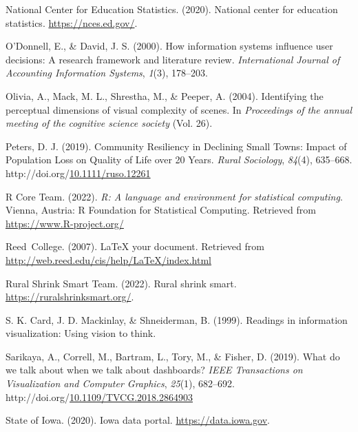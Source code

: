 \documentclass[print]{nuthesis}
\newlength{\cslhangindent}
\newenvironment{CSLReferences}[2]%
{\setlength{\parindent}{0pt}%
\everypar{\setlength{\hangindent}{\cslhangindent}}\ignorespaces}%
{\par}
\begin{document}
\begin{CSLReferences}{1}{0}
\leavevmode{}%
National Center for Education Statistics. (2020). National center for education statistics. \url{https://nces.ed.gov/}.

\leavevmode{}%
O'Donnell, E., \& David, J. S. (2000). How information systems influence user decisions: A research framework and literature review. \emph{International Journal of Accounting Information Systems}, \emph{1}(3), 178--203.

\leavevmode{}%
Olivia, A., Mack, M. L., Shrestha, M., \& Peeper, A. (2004). Identifying the perceptual dimensions of visual complexity of scenes. In \emph{Proceedings of the annual meeting of the cognitive science society} (Vol. 26).

\leavevmode{}%
Peters, D. J. (2019). Community {Resiliency} in {Declining} {Small} {Towns}: {Impact} of {Population} {Loss} on {Quality} of {Life} over 20 {Years}. \emph{Rural Sociology}, \emph{84}(4), 635--668. http://doi.org/\href{https://doi.org/10.1111/ruso.12261}{10.1111/ruso.12261}

\leavevmode{}%
R Core Team. (2022). \emph{R: A language and environment for statistical computing}. Vienna, Austria: R Foundation for Statistical Computing. Retrieved from \url{https://www.R-project.org/}

\leavevmode{}%
Reed~College. (2007). LaTeX your document. Retrieved from \url{http://web.reed.edu/cis/help/LaTeX/index.html}

\leavevmode{}%
Rural Shrink Smart Team. (2022). Rural shrink smart. \url{https://ruralshrinksmart.org/}.

\leavevmode{}%
S. K. Card, J. D. Mackinlay, \& Shneiderman, B. (1999). Readings in information visualization: Using vision to think.

\leavevmode{}%
Sarikaya, A., Correll, M., Bartram, L., Tory, M., \& Fisher, D. (2019). What do we talk about when we talk about dashboards? \emph{IEEE Transactions on Visualization and Computer Graphics}, \emph{25}(1), 682--692. http://doi.org/\href{https://doi.org/10.1109/TVCG.2018.2864903}{10.1109/TVCG.2018.2864903}

\leavevmode{}%
State of Iowa. (2020). Iowa data portal. \url{https://data.iowa.gov}.


\end{CSLReferences}
\end{document}
